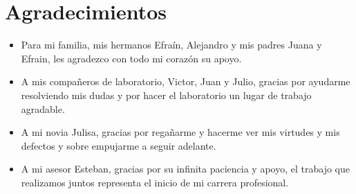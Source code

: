 \chapter{Agradecimientos}
    
    \begin{itemize}
        \item Para mi familia, mis hermanos Efraín, Alejandro y mis padres Juana y Efrain, les agradezco con todo mi corazón su apoyo.
        \item A mis compañeros de laboratorio, Victor, Juan y Julio, gracias por ayudarme resolviendo mis dudas y por hacer el laboratorio un lugar de trabajo agradable.
        \item A mi novia Julisa, gracias por regañarme y hacerme ver mis virtudes y mis defectos y sobre empujarme a seguir adelante.
        \item A mi asesor Esteban, gracias por su infinita paciencia y apoyo, el trabajo que realizamos juntos representa el inicio de mi carrera profesional.
    \end{itemize}

